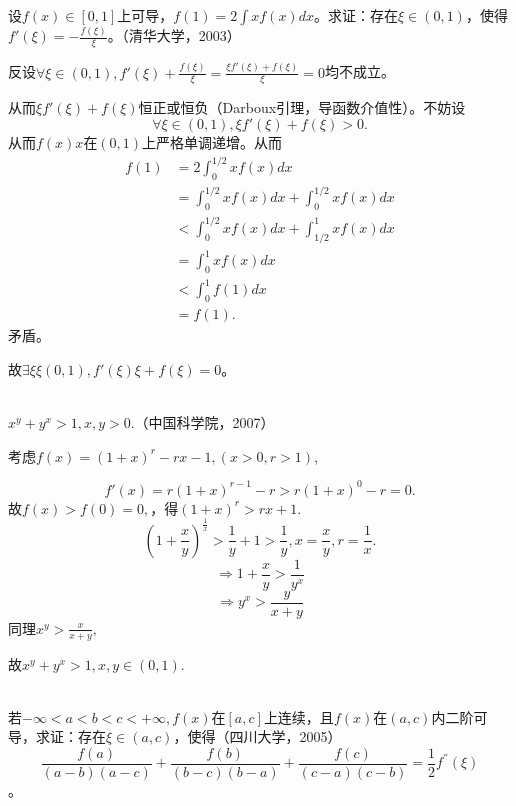   \begin{example}
    设$f(x)\in[0,1]$上可导，$f(1)=2\int xf(x)dx$。求证：存在$\xi\in(0,1)$，使得$f'(\xi)=-\frac{f(\xi)}{\xi}$。（清华大学，2003）
  
  
  反设$\forall\xi\in(0,1),f'(\xi)+\frac{f(\xi)}{\xi}=\frac{\xi f'(\xi)+f(\xi)}{\xi}=0$均不成立。
  
  从而$\xi f'(\xi)+f(\xi)$恒正或恒负（Darboux引理，导函数介值性）。不妨设
  $$\forall\xi\in(0,1),\xi f'(\xi)+f(\xi)>0.$$
  从而$f(x)x$在$(0,1)$上严格单调递增。从而
  \[
  \begin{aligned}
  f(1)&=2\int_0^{1/2}xf(x)dx\\
  &=\int_0^{1/2}xf(x)dx+\int_0^{1/2}xf(x)dx\\
  &<\int_0^{1/2}xf(x)dx+\int_{1/2}^1xf(x)dx\\
  &=\int_0^1xf(x)dx\\
  &<\int_0^1f(1)dx\\
  &=f(1).
  \end{aligned}
  \]
  矛盾。
  
  故$\exists\xi\xi(0,1),f'(\xi)\xi+f(\xi)=0$。
  \end{example}
  \begin{example}
  \hfill\\
  $x^y+y^x>1,x,y>0$.（中国科学院，2007）
  
  
  考虑$f(x)=(1+x)^r-rx-1,(x>0,r>1)$,
  
  $$f'(x)=r(1+x)^{r-1}-r>r(1+x)^0-r=0.$$
  故$f(x)>f(0)=0,$，得$(1+x)^r>rx+1.$
  $$(1+\frac{x}{y})^{\frac1x}>\frac1y+1>\frac1y,x=\frac xy,r=\frac1x.$$
  $$\Longrightarrow 1+\frac xy>\frac{1}{y^x}$$
  $$\Longrightarrow y^x>\frac{y}{x+y}$$
  同理$x^y>\frac{x}{x+y},$
  
  故$x^y+y^x>1,x,y\in(0,1).$ 
  \end{example}
  \begin{example}
  \hfill\\
   若$-\infty<a<b<c<+\infty,f(x)$在$[a,c]$上连续，且$f(x)$在$(a,c)$内二阶可导，求证：存在$\xi\in(a,c)$，使得（四川大学，2005）$$\frac{f(a)}{(a-b)(a-c)}+\frac{f(b)}{(b-c)(b-a)}+\frac{f(c)}{(c-a)(c-b)}=\frac12f^{''}(\xi)$$。
\end{example}
